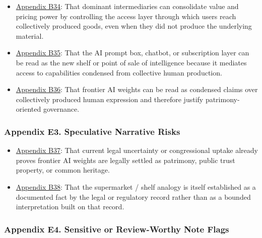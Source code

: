 \documentclass[
  american,
  11pt,
  letterpaper,
]{article}
\providecommand{\tightlist}{%
  \setlength{\itemsep}{0pt}\setlength{\parskip}{0pt}}
\begin{document}
\begin{itemize}
\tightlist
\item
  \hyperref[ch-04-appendix-b34-dominant-intermediaries-can-consolidate-value-and-pricing-power-by-controlling-th]{Appendix
  B34}: That dominant intermediaries can consolidate value and pricing
  power by controlling the access layer through which users reach
  collectively produced goods, even when they did not produce the
  underlying material.
\item
  \hyperref[ch-04-appendix-b35-the-ai-prompt-box-chatbot-or-subscription-layer-can-be-read-as-the-new-shelf-or]{Appendix
  B35}: That the AI prompt box, chatbot, or subscription layer can be
  read as the new shelf or point of sale of intelligence because it
  mediates access to capabilities condensed from collective human
  production.
\item
  \hyperref[ch-04-appendix-b36-frontier-ai-weights-can-be-read-as-condensed-claims-over-collectively-produced-hu]{Appendix
  B36}: That frontier AI weights can be read as condensed claims over
  collectively produced human expression and therefore justify
  patrimony-oriented governance.
\end{itemize}

\subsubsection{Appendix E3. Speculative Narrative
Risks}\label{ch-04-appendix-e3-speculative-narrative-risks}

\begin{itemize}
\tightlist
\item
  \hyperref[ch-04-appendix-b37-current-legal-uncertainty-or-congressional-uptake-already-proves-frontier-ai-weig]{Appendix
  B37}: That current legal uncertainty or congressional uptake already
  proves frontier AI weights are legally settled as patrimony, public
  trust property, or common heritage.
\item
  \hyperref[ch-04-appendix-b38-the-supermarket-shelf-analogy-is-itself-established-as-a-documented-fact-by-the]{Appendix
  B38}: That the supermarket / shelf analogy is itself established as a
  documented fact by the legal or regulatory record rather than as a
  bounded interpretation built on that record.
\end{itemize}

\subsubsection{Appendix E4. Sensitive or Review-Worthy Note
Flags}\label{ch-04-appendix-e4-sensitive-or-review-worthy-note-flags}
\end{document}
